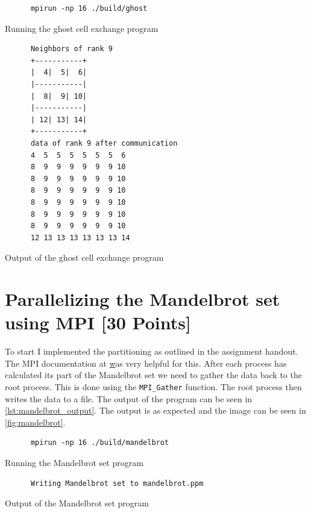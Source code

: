 \documentclass[unicode,11pt,a4paper,oneside,numbers=endperiod,openany]{scrartcl}
\begin{document}
\begin{listing}[h!t]
      \begin{verbatim}
      mpirun -np 16 ./build/ghost
      \end{verbatim}
      \caption{Running the ghost cell exchange program}
      \label{lst:ghost_run}
\end{listing}

\begin{listing}[h!t]
      \begin{verbatim}
      Neighbors of rank 9
      +-----------+
      |  4|  5|  6|
      |-----------|
      |  8|  9| 10|
      |-----------|
      | 12| 13| 14|
      +-----------+
      data of rank 9 after communication
      4  5  5  5  5  5  5  6 
      8  9  9  9  9  9  9 10 
      8  9  9  9  9  9  9 10 
      8  9  9  9  9  9  9 10 
      8  9  9  9  9  9  9 10 
      8  9  9  9  9  9  9 10 
      8  9  9  9  9  9  9 10 
      12 13 13 13 13 13 13 14 
      \end{verbatim}
      \caption{Output of the ghost cell exchange program}
      \label{lst:ghost_output}
\end{listing}


\section{Parallelizing the Mandelbrot set using MPI [30 Points]}

To start I implemented the partitioning as outlined in the assignment handout. The MPI documentation at \href{https://rookiehpc.org/mpi/docs/} was very helpful for this. After each process has calculated its part of the Mandelbrot set we need to gather the data back to the root process. This is done using the \texttt{MPI\_Gather} function. The root process then writes the data to a file. The output of the program can be seen in \ref{lst:mandelbrot_output}. The output is as expected and the image can be seen in \ref{fig:mandelbrot}.

\begin{listing}[h!t]
      \begin{verbatim}
      mpirun -np 16 ./build/mandelbrot
      \end{verbatim}
      \caption{Running the Mandelbrot set program}
      \label{lst:mandelbrot_run}
\end{listing}

\begin{listing}[h!t]
      \begin{verbatim}
      Writing Mandelbrot set to mandelbrot.ppm
      \end{verbatim}
      \caption{Output of the Mandelbrot set program}
      \label{lst:mandelbrot_output}
\end{listing}
\end{document}
